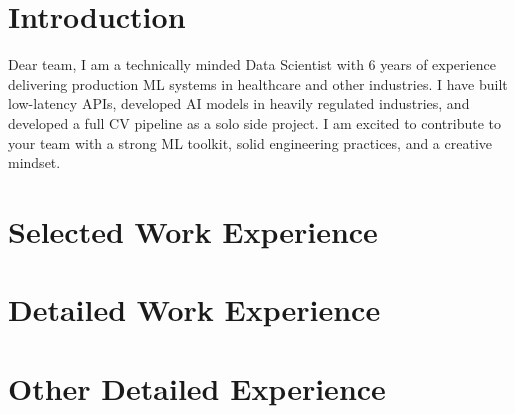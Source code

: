 \documentclass[11pt,a4paper]{moderncv}
\begin{document}
\makecvtitle

\section*{Introduction}
Dear \company{} team, I am a technically minded Data Scientist with 6 years of experience delivering production ML systems in healthcare and other industries. I have built low-latency APIs, developed AI models in heavily regulated industries, and developed a full CV pipeline as a solo side project. I am excited to contribute to your team with a strong ML toolkit, solid engineering practices, and a creative mindset.

\section{Selected Work Experience}







\newpage
\section{Detailed Work Experience}





\section{Other Detailed Experience}

\end{document}
